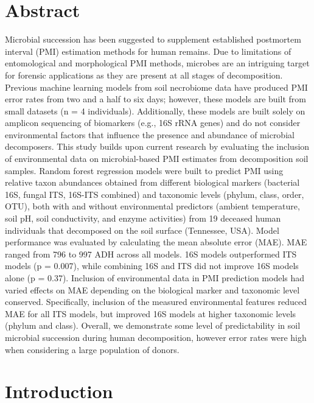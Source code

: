 \documentclass[
  10pt,
  letterpaper,
]{article}
\begin{document}
\section*{Abstract}
Microbial succession has been suggested to supplement established
postmortem interval (PMI) estimation methods for human remains. Due to
limitations of entomological and morphological PMI methods, microbes are
an intriguing target for forensic applications as they are present at
all stages of decomposition. Previous machine learning models from soil
necrobiome data have produced PMI error rates from two and a half to six
days; however, these models are built from small datasets (n = 4
individuals). Additionally, these models are built solely on amplicon
sequencing of biomarkers (e.g., 16S rRNA genes) and do not consider
environmental factors that influence the presence and abundance of
microbial decomposers. This study builds upon current research by
evaluating the inclusion of environmental data on microbial-based PMI
estimates from decomposition soil samples. Random forest regression
models were built to predict PMI using relative taxon abundances
obtained from different biological markers (bacterial 16S, fungal ITS,
16S-ITS combined) and taxonomic levels (phylum, class, order, OTU), both
with and without environmental predictors (ambient temperature, soil pH,
soil conductivity, and enzyme activities) from 19 deceased human
individuals that decomposed on the soil surface (Tennessee, USA). Model
performance was evaluated by calculating the mean absolute error (MAE).
MAE ranged from 796 to 997 ADH across all models. 16S models
outperformed ITS models (p = 0.007), while combining 16S and ITS did not
improve 16S models alone (p = 0.37). Inclusion of environmental data in
PMI prediction models had varied effects on MAE depending on the
biological marker and taxonomic level conserved. Specifically, inclusion
of the measured environmental features reduced MAE for all ITS models,
but improved 16S models at higher taxonomic levels (phylum and class).
Overall, we demonstrate some level of predictability in soil microbial
succession during human decomposition, however error rates were high
when considering a large population of donors.


\linenumbers\hypertarget{introduction}{%
\section{Introduction}\label{introduction}}
\end{document}
